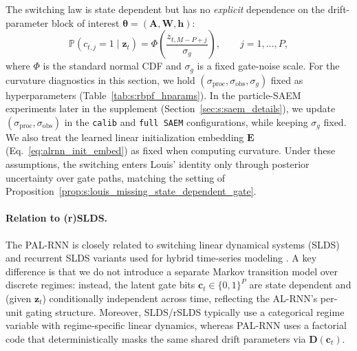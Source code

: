 \documentclass[twoside]{article}
\theoremstyle{plain}
\theoremstyle{definition}
\theoremstyle{remark}
\begin{document}
The switching law is state dependent but has no \emph{explicit} dependence on the drift-parameter block of interest $\bm\theta=(\bm A,\bm W,\bm h)$:
\begin{equation}
\mathbb{P}(c_{t,j}=1\mid \bm{z}_t) = \Phi\!\left(\frac{z_{t,M-P+j}}{\sigma_g}\right),\qquad j=1,\dots,P,
\end{equation}
where $\Phi$ is the standard normal CDF and $\sigma_g$ is a fixed gate-noise scale.
For the curvature diagnostics in this section, we hold $(\sigma_{\mathrm{proc}},\sigma_{\mathrm{obs}},\sigma_g)$ fixed as hyperparameters (Table~\ref{tab:s:rbpf_hparams}). In the particle-SAEM experiments later in the supplement (Section~\ref{sec:s:saem_details}), we update $(\sigma_{\mathrm{proc}},\sigma_{\mathrm{obs}})$ in the \texttt{calib} and \texttt{full SAEM} configurations, while keeping $\sigma_g$ fixed.
We also treat the learned linear initialization embedding $\bm E$ (Eq.~\eqref{eq:alrnn_init_embed}) as fixed when computing curvature.
Under these assumptions, the switching enters Louis’ identity only through posterior uncertainty over gate paths, matching the setting of Proposition~\ref{prop:s:louis_missing_state_dependent_gate}.
\paragraph{Relation to (r)SLDS.}
The PAL-RNN is closely related to switching linear dynamical systems (SLDS) and recurrent SLDS variants used for hybrid time-series modeling \citep{ghahramani2000switchingssm,murphy1998switchingkf,linderman2017rslds}. A key difference is that we do not introduce a separate Markov transition model over discrete regimes: instead, the latent gate bits $\bm c_t\in\{0,1\}^P$ are state dependent and (given $\bm z_t$) conditionally independent across time, reflecting the AL-RNN's per-unit gating structure. Moreover, SLDS/rSLDS typically use a categorical regime variable with regime-specific linear dynamics, whereas PAL-RNN uses a factorial code that deterministically masks the same shared drift parameters via $\bm D(\bm c_t)$.
\end{document}
